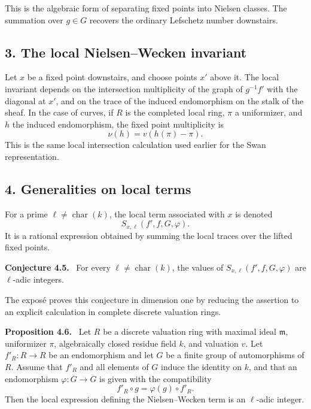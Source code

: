 \documentclass[14pt]{extarticle}
\newenvironment{statement}[1]{\par\medskip\noindent\textbf{#1.}\ }{\par\medskip}
\begin{document}
This is the algebraic form of separating fixed points into Nielsen classes. The summation over $g\in G$ recovers the ordinary Lefschetz number downstairs.

\subsection*{3. The local Nielsen--Wecken invariant}

Let $x$ be a fixed point downstairs, and choose points $x'$ above it. The local invariant depends on the intersection multiplicity of the graph of $g^{-1}f'$ with the diagonal at $x'$, and on the trace of the induced endomorphism on the stalk of the sheaf. In the case of curves, if $R$ is the completed local ring, $\pi$ a uniformizer, and $h$ the induced endomorphism, the fixed point multiplicity is
\[
   \nu(h)=v(h(\pi)-\pi).
\]
This is the same local intersection calculation used earlier for the Swan representation.

\subsection*{4. Generalities on local terms}

For a prime $\ell\ne\operatorname{char}(k)$, the local term associated with $x$ is denoted
\[
   S_{x,\ell}(f',f,G,\varphi).
\]
It is a rational expression obtained by summing the local traces over the lifted fixed points.

\begin{statement}{Conjecture 4.5}
For every $\ell\ne\operatorname{char}(k)$, the values of $S_{x,\ell}(f',f,G,\varphi)$ are $\ell$-adic integers.
\end{statement}

The expos\'e proves this conjecture in dimension one by reducing the assertion to an explicit calculation in complete discrete valuation rings.

\begin{statement}{Proposition 4.6}
Let $R$ be a discrete valuation ring with maximal ideal $\mathfrak m$, uniformizer $\pi$, algebraically closed residue field $k$, and valuation $v$. Let $f'_R:R\to R$ be an endomorphism and let $G$ be a finite group of automorphisms of $R$. Assume that $f'_R$ and all elements of $G$ induce the identity on $k$, and that an endomorphism $\varphi:G\to G$ is given with the compatibility
\[
   f'_R\circ g = \varphi(g)\circ f'_R.
\]
Then the local expression defining the Nielsen--Wecken term is an $\ell$-adic integer.
\end{statement}
\end{document}
